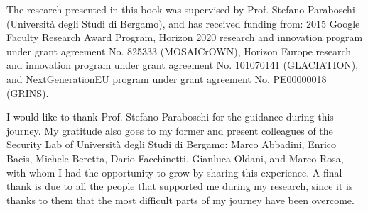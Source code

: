 The research presented in this book was
supervised by Prof. Stefano Paraboschi (Università degli Studi di
Bergamo), and has received funding from: 2015 Google Faculty Research
Award Program, Horizon 2020 research and innovation program under
grant agreement No. 825333 (MOSAICrOWN), Horizon Europe research and
innovation program under grant agreement No. 101070141 (GLACIATION),
and NextGenerationEU program under grant agreement No. PE00000018
(GRINS).

I would like to thank Prof. Stefano Paraboschi for the guidance during
this journey. My gratitude also goes to my former and present
colleagues of the Security Lab of Università degli Studi di Bergamo:
Marco Abbadini, Enrico Bacis, Michele Beretta, Dario Facchinetti,
Gianluca Oldani, and Marco Rosa, with whom I had the opportunity to
grow by sharing this experience. A final thank is due to all the
people that supported me during my research, since it is thanks to them
that the most difficult parts of my journey have been overcome.
